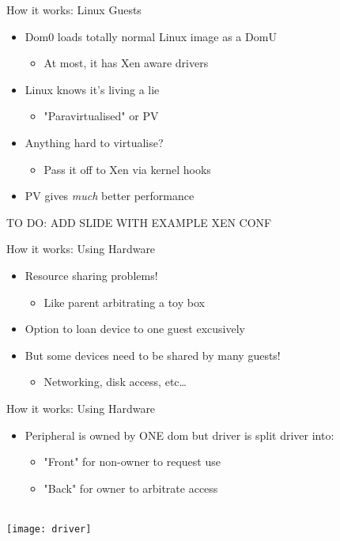 \documentclass[xelatex]{beamer}
\begin{document}
\begin{frame}{How it works: Linux Guests}
\begin{itemize}
\item Dom0 loads totally normal Linux image as a DomU
\begin{itemize}
\item At most, it has Xen aware drivers
\end{itemize}
\item Linux knows it's living a lie
\begin{itemize}
\item {\color{blue}"Paravirtualised"} or {\color{blue}PV}
\end{itemize}
\item Anything hard to virtualise?
\begin{itemize}
\item {Pass it off to Xen via kernel hooks}
\end{itemize}
\item PV gives \emph{much} better performance
\end{itemize}
TO DO: ADD SLIDE WITH EXAMPLE XEN CONF
\end{frame}

\begin{frame}{How it works: Using Hardware}
\begin{itemize}
\item Resource sharing problems!
\begin{itemize}
\item Like parent arbitrating a toy box
\end{itemize}
\item Option to loan device to one guest excusively
\item But some devices need to be shared by many guests!
\begin{itemize}
\item Networking, disk access, etc\ldots
\end{itemize}
\end{itemize}
\end{frame}

\begin{frame}{How it works: Using Hardware}
\begin{itemize}
\item Peripheral is owned by ONE dom but driver is split driver into:
\begin{itemize}
\item "Front" for non-owner to request use
\item "Back" for owner to arbitrate access
\end{itemize}
\end{itemize}
~\\
\centering
\texttt{[image: driver]}
\end{frame}
\end{document}

